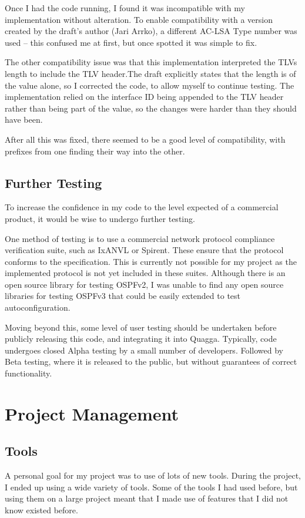 \documentclass[12pt,a4paper,twoside]{report}
\begin{document}
Once I had the code running, I found it was incompatible with my implementation
without alteration. To enable compatibility with a version created by the
draft's author (Jari Arrko), a different AC-LSA Type number was used -- this
confused me at first, but once spotted it was simple to fix.

The other compatibility issue was that this implementation interpreted the TLVs
length to include the TLV header.The draft explicitly states that the length is
of the value alone, so I corrected the code, to allow myself to continue
testing. The implementation relied on the interface ID being appended to the
TLV header rather than being part of the value, so the changes were harder than
they should have been.

After all this was fixed, there seemed to be a good level of compatibility,
with prefixes from one finding their way into the other.

\section{Further Testing}
To increase the confidence in my code to the level expected of a
commercial product, it would be wise to undergo further testing. 

One method of testing is to use a commercial network protocol compliance
verification suite, such as IxANVL or Spirent. These ensure that the protocol
conforms to the specification. This is currently not possible for my project as
the implemented protocol is not yet included in these suites.  Although there
is an open source library for testing OSPFv2, I was unable to find any open
source libraries for testing OSPFv3 that could be easily extended to test
autoconfiguration. 

Moving beyond this, some level of user testing should be undertaken before
publicly releasing this code, and integrating it into Quagga. Typically, code
undergoes closed Alpha testing by a small number of developers. Followed by
Beta testing, where it is released to the public, but without guarantees of
correct functionality.

\chapter{Project Management}
\section{Tools}
A personal goal for my project was to use of lots of new tools. During the
project, I ended up using a wide variety of tools. Some of the tools I had used
before, but using them on a large project meant that I made use of features that
I did not know existed before.
\end{document}
